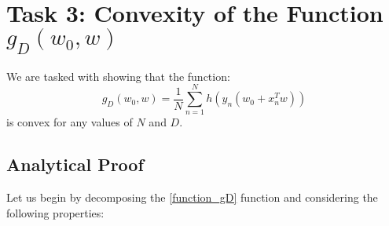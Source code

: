 \documentclass[a4paper,12pt]{report}
\begin{document}
\newpage


\newpage

\pagestyle{aftertoc}

\section{Task 3: Convexity of the Function $g_D(w_0, w)$}

We are tasked with showing that the function:
\begin{equation}
    g_D(w_0, w) = \frac{1}{N} \sum_{n=1}^{N} h\left(y_n\left(w_0 + x_n^T w\right) \right)
    \label{function_gD}
\end{equation}
is convex for any values of \( N \) and \( D \).

\subsection{Analytical Proof}

Let us begin by decomposing the \eqref{function_gD} function and considering the following properties:
\end{document}
